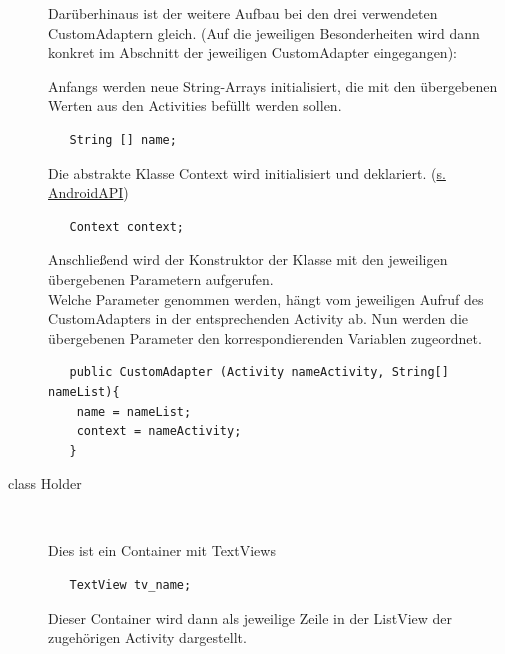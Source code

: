 \begin{description}
Darüberhinaus ist der weitere Aufbau bei den drei verwendeten CustomAdaptern gleich. (Auf die jeweiligen Besonderheiten wird dann konkret im Abschnitt der jeweiligen CustomAdapter eingegangen):

Anfangs werden neue String-Arrays initialisiert, die mit den übergebenen Werten aus den Activities befüllt werden sollen.
\begin{lstlisting}
   String [] name;
\end{lstlisting}
Die abstrakte Klasse Context wird initialisiert und deklariert. (\href{http://developer.android.com/reference/android/content/Context.html}{s. AndroidAPI})
\begin{lstlisting}
   Context context;
\end{lstlisting}
Anschließend wird der Konstruktor der Klasse mit den jeweiligen übergebenen Parametern aufgerufen. \\ Welche Parameter genommen werden, hängt vom jeweiligen Aufruf des CustomAdapters in der entsprechenden Activity ab.
Nun werden die übergebenen Parameter den korrespondierenden Variablen zugeordnet.

\begin{lstlisting}
   public CustomAdapter (Activity nameActivity, String[] nameList){
    name = nameList;
    context = nameActivity;
   }
\end{lstlisting}


\item [class Holder]~\par
Dies ist ein Container mit TextViews
\begin{lstlisting}
   TextView tv_name;
\end{lstlisting}
Dieser Container wird dann als jeweilige Zeile in der ListView der zugehörigen Activity dargestellt.


\end{description}
